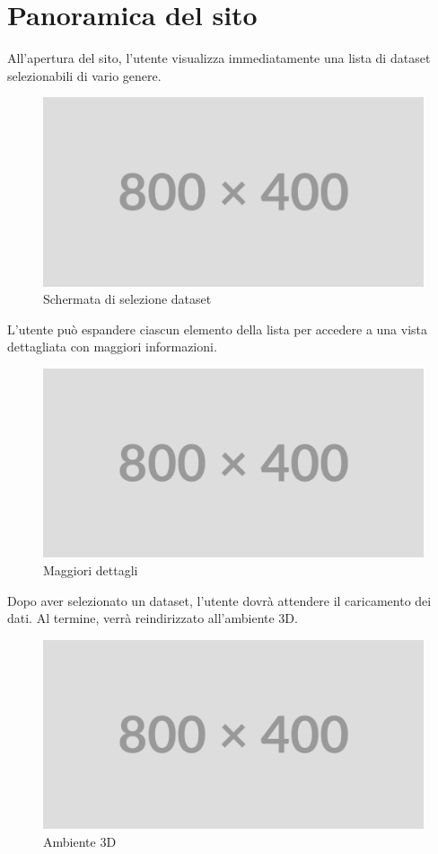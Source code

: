 \section{Panoramica del sito}
All'apertura del sito, l'utente visualizza immediatamente una lista di dataset selezionabili di vario genere.
\begin{figure}[h!]
    \centering
    \includegraphics[scale=0.6]{template/images/placeholder.png}
    \caption{Schermata di selezione dataset}
\end{figure}
\newline
\newline
L'utente può espandere ciascun elemento della lista per accedere a una vista dettagliata con maggiori informazioni.
\begin{figure}[h!]
    \centering
    \includegraphics[scale=0.6]{template/images/placeholder.png}
    \caption{Maggiori dettagli}
\end{figure}
\newline
\newline
Dopo aver selezionato un dataset, l'utente dovrà attendere il caricamento dei dati. Al termine, verrà reindirizzato all'ambiente 3D.
\begin{figure}[h!]
    \centering
    \includegraphics[scale=0.6]{template/images/placeholder.png}
    \caption{Ambiente 3D}
\end{figure}
